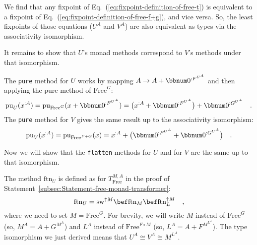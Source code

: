 We find that any fixpoint of Eq.~(\ref{eq:fixpoint-definition-of-free-t})
is equivalent to a fixpoint of Eq.~(\ref{eq:fixpoint-definition-of-free-f+g}),
and vice versa. So, the least fixpoints of those equations ($U^{A}$
and $V^{A}$) are also equivalent as types via the associativity isomorphism.

It remains to show that $U$\textsf{'}s monad methods correspond to $V$\textsf{'}s
methods under that isomorphism.

The \lstinline!pure! method for $U$ works by mapping $A\rightarrow A+\bbnum 0^{:F^{U^{A}}}$
and then applying the pure method of $\text{Free}^{G}$:
\[
\text{pu}_{U}(x^{:A})=\text{pu}_{\text{Free}^{G}}(x+\bbnum 0^{:F^{U^{A}}})=\big(x^{:A}+\bbnum 0^{:F^{U^{A}}}\big)+\bbnum 0^{:G^{U^{A}}}\quad.
\]
The \lstinline!pure! method for $V$ gives the same result up to
the associativity isomorphism:
\[
\text{pu}_{V}(x^{:A})=\text{pu}_{\text{Free}^{F+G}}(x)=x^{:A}+\big(\bbnum 0^{:F^{U^{A}}}+\bbnum 0^{:G^{U^{A}}}\big)\quad.
\]

Now we will show that the \lstinline!flatten! methods for $U$ and
for $V$ are the same up to that isomorphism. 

The method $\text{ftn}_{U}$ is defined as for $T_{\text{Free}}^{M,A}$
in the proof of Statement~\ref{subsec:Statement-free-monad-transformer}:
\[
\text{ftn}_{U}=\text{sw}^{\uparrow M}\bef\text{ftn}_{M}\bef\text{ftn}_{L}^{\uparrow M}\quad,
\]
where we need to set $M=\text{Free}^{G}$. For brevity, we will write
$M$ instead of $\text{Free}^{G}$ (so, $M^{A}=A+G^{M^{A}}$) and
$L^{A}$ instead of $\text{Free}^{F\circ M}$ (so, $L^{A}=A+F^{M^{L^{A}}}$).
The type isomorphism we just derived means that $U^{A}\cong V^{A}\cong M^{L^{A}}$.

